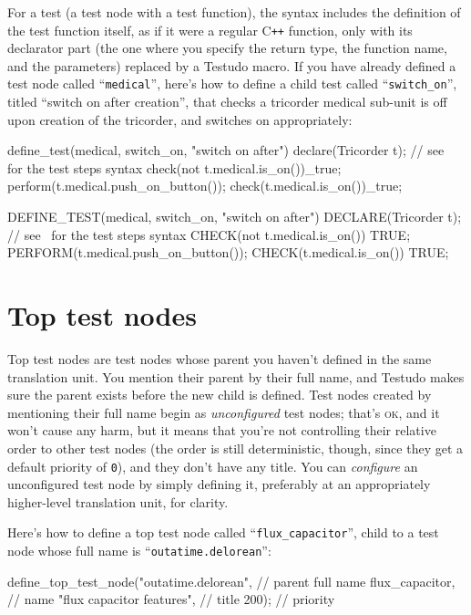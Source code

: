 \documentclass[twoside, a4paper, article]{memoir}
\newcommand*\Cpp{C\texttt{++}}
\begin{document}
For a test (a test node with a test function), the syntax includes the
definition of the test function itself, as if it were a regular \Cpp{}
function, only with its declarator part (the one where you specify the return
type, the function name, and the parameters) replaced by a Testudo macro.  If
you have already defined a test node called ``\texttt{medical}'', here's how to
define a child test called ``\texttt{switch\_on}'', titled ``switch on after
creation'', that checks a tricorder medical sub-unit is off upon creation of the
tricorder, and switches on appropriately:
\begin{cpplisting}
define_test(medical, switch_on, "switch on after") {
  declare(Tricorder t); // see~ for the test steps syntax
  check(not t.medical.is_on())_true;
  perform(t.medical.push_on_button());
  check(t.medical.is_on())_true;
}
\end{cpplisting}

\begin{cpplisting}
DEFINE_TEST(medical, switch_on, "switch on after")
{
  DECLARE(Tricorder t); // see~ for the test steps syntax
  CHECK(not t.medical.is_on()) TRUE;
  PERFORM(t.medical.push_on_button());
  CHECK(t.medical.is_on()) TRUE;
}
\end{cpplisting}

\section{Top test nodes}
\label{sec:top-test-nodes}

Top test nodes are test nodes whose parent you haven't defined in the same
translation unit.  You mention their parent by their full name, and Testudo
makes sure the parent exists before the new child is defined.  Test nodes
created by mentioning their full name begin as \emph{unconfigured} test nodes;
that's \textsc{ok}, and it won't cause any harm, but it means that you're not
controlling their relative order to other test nodes (the order is still
deterministic, though, since they get a default priority of \texttt{0}), and
they don't have any title.  You can \emph{configure} an unconfigured test node
by simply defining it, preferably at an appropriately higher-level translation
unit, for clarity.

Here's how to define a top test node called ``\texttt{flux\_capacitor}'', child
to a test node whose full name is ``\texttt{outatime.delorean}'':
\begin{cpplisting}
define_top_test_node("outatime.delorean", // parent full name
                     flux_capacitor, // name
                     "flux capacitor features", // title
                     200); // priority
\end{cpplisting}
\end{document}
